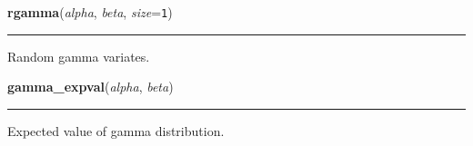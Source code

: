     \vspace{0.5ex}

    \begin{boxedminipage}{\textwidth}

    \raggedright \textbf{rgamma}(\textit{alpha}, \textit{beta}, \textit{size}=\texttt{1})

    \vspace{-1.5ex}

    \rule{\textwidth}{0.5\fboxrule}

Random gamma variates.
    \vspace{1ex}

    \end{boxedminipage}

    \label{pymc:distributions:gamma_expval}

    \vspace{0.5ex}

    \begin{boxedminipage}{\textwidth}

    \raggedright \textbf{gamma\_expval}(\textit{alpha}, \textit{beta})

    \vspace{-1.5ex}

    \rule{\textwidth}{0.5\fboxrule}

Expected value of gamma distribution.
    \vspace{1ex}

    \end{boxedminipage}

    \label{pymc:distributions:gamma_like}

    \vspace{0.5ex}

